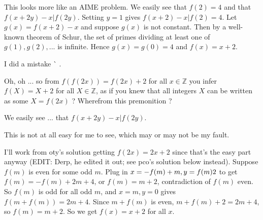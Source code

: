 \begin{solution}
	This looks more like an AIME problem. We easily see that $f(2)=4$ and that $f(x+2y)-x|f(2y)$. Setting $y=1$ gives $f(x+2)-x|f(2)=4$. Let $g(x)=f(x+2)-x$ and suppose $g(x)$ is not constant. Then by a well-known theorem of Schur, the set of primes dividing at least one of $g(1), g(2),...$ is infinite. Hence $g(x)=g(0)=4$ and $f(x)=x+2$.
\end{solution}



\begin{solution}
	I did a mistake ^^  .
\end{solution}



\begin{solution}
	Oh, oh ... so from $f(f(2x))=f(2x)+2$ for all $x\in \mathbb{Z}$ you infer $f(X)=X+2$ for all $X\in \mathbb{Z}$, as if you knew that all integers $X$ can be written as some $X=f(2x)$ ? Wherefrom this premonition ?
\end{solution}



\begin{solution}
	\begin{tcolorbox}We easily see ... that $f(x+2y)-x|f(2y)$.\end{tcolorbox}
This is not at all easy for me to see, which may or may not be my fault.

I'll work from oty's solution getting $f(2x) = 2x+2$ since that's the easy part anyway (EDIT: Derp, he edited it out; see pco's solution below instead). Suppose $f(m)$ is even for some odd $m$. Plug in $x = -f(m)+m, y = f(m)\/2$ to get $f(m) = -f(m)+2m+4$, or $f(m) = m+2$, contradiction of $f(m)$ even. So $f(m)$ is odd for all odd $m$, and $x = m, y = 0$ gives $f(m+f(m)) = 2m+4$. Since $m+f(m)$ is even, $m+f(m)+2 = 2m+4$, so $f(m) = m+2$. So we get $f(x) = x+2$ for all $x$.
\end{solution}







